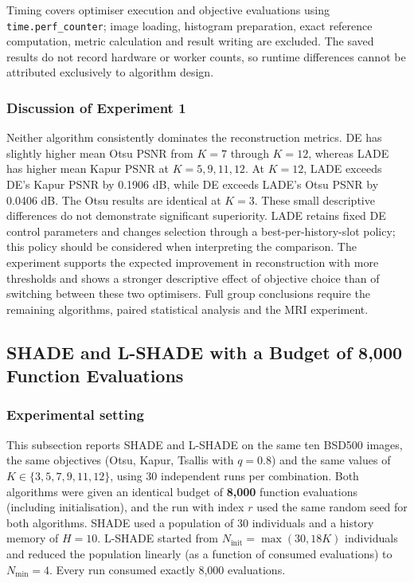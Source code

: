 \documentclass[review]{elsarticle}
\begin{document}
Timing covers optimiser execution and objective evaluations using \texttt{time.perf\_counter}; image loading, histogram preparation, exact reference computation, metric calculation and result writing are excluded. The saved results do not record hardware or worker counts, so runtime differences cannot be attributed exclusively to algorithm design.

\subsubsection{Discussion of Experiment 1}

Neither algorithm consistently dominates the reconstruction metrics. DE has slightly higher mean Otsu PSNR from $K=7$ through $K=12$, whereas LADE has higher mean Kapur PSNR at $K=5,9,11,12$. At $K=12$, LADE exceeds DE's Kapur PSNR by 0.1906 dB, while DE exceeds LADE's Otsu PSNR by 0.0406 dB. The Otsu results are identical at $K=3$. These small descriptive differences do not demonstrate significant superiority. LADE retains fixed DE control parameters and changes selection through a best-per-history-slot policy; this policy should be considered when interpreting the comparison. The experiment supports the expected improvement in reconstruction with more thresholds and shows a stronger descriptive effect of objective choice than of switching between these two optimisers. Full group conclusions require the remaining algorithms, paired statistical analysis and the MRI experiment.

\subsection{SHADE and L-SHADE with a Budget of 8{,}000 Function Evaluations}
\label{sec:shade-lshade}

\subsubsection{Experimental setting}

This subsection reports SHADE and L-SHADE on the same ten BSD500 images, the
same objectives (Otsu, Kapur, Tsallis with $q=0.8$) and the same values of
$K\in\{3,5,7,9,11,12\}$, using 30 independent runs per combination. Both
algorithms were given an identical budget of \textbf{8{,}000} function
evaluations (including initialisation), and the run with index $r$ used the
same random seed for both algorithms. SHADE used a population of 30
individuals and a history memory of $H=10$. L-SHADE started from
$N_{\text{init}}=\max(30,18K)$ individuals and reduced the population linearly
(as a function of consumed evaluations) to $N_{\min}=4$. Every run consumed
exactly 8{,}000 evaluations.
\end{document}
